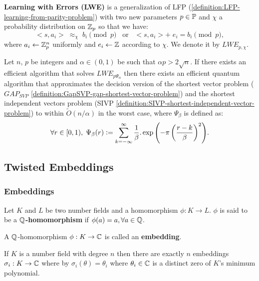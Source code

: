 \documentclass[a4paper,12pt]{article}
\begin{document}
\begin{definition}\label{definition:LWE-learning-with-errors-problem}
  \textbf{Learning with Errors (LWE)} is a generalization of LFP (\ref{definition:LFP-learning-from-parity-problem}) with two new parameters $p \in \P$ and $\chi$ a probability distribution on $\Z_p$ so that we have:
\[
  <s, a_i> \; \approx_\chi \; b_i \pmod p \;\;\; \text{or} \;\;\; <s, a_i> + \; e_i =  b_i \pmod p ,
    \]
     where $a_i \gets \Z^n_p$ uniformly and $e_i \gets \Z$ according to $\chi$. We denote
     it by $LWE_{p,\chi}$.

\end{definition}


\begin{theorem}
  Let $n$, $p$ be integers and $\alpha \in (0, 1)$ be such that $\alpha p > 2\sqrt{n}$. If
  there exists an efficient algorithm that solves $LWE_{p \Psi_\alpha}$ then there
  exists an efficient quantum algorithm that approximates the decision version
  of the shortest vector problem ($GAP_{SVP}$ \ref{definition:GapSVP-gap-shortest-vector-problem}) and the
  shortest independent vectors problem (SIVP \ref{definition:SIVP-shortest-independent-vector-problem}) to within
  $\tilde{O}(n/\alpha)$ in the worst case,  where $\Psi_\beta$ is defined as:
  $$
  \forall r \in [0,1), \; \Psi_\beta(r) \defsym \sum_{k=-\infty}^\infty{\frac{1}{\beta} . \exp{\left( -\pi \left( \frac{r-k}{\beta} \right)^2 \right)}}.
  $$
\end{theorem}
\subsection{Twisted Embeddings}
\label{sec:org803c9d7}
\subsubsection{Embeddings}
\label{sec:org280cbf1}

\begin{definition}
Let $K$ and $L$ be two number fields and a homomorphism $\phi: K \rightarrow L$. $\phi$ is said to be a \textbf{$\Q$-homomorphism} if $\phi(a) = a, \forall a \in \Q$.
\end{definition}

\begin{definition}
A $\Q$-homomorphism $\phi: K \rightarrow \C$ is called an \textbf{embedding}.
\end{definition}

\begin{theorem}
 If $K$ is a number field with degree $n$ then there are
exactly $n$ embeddings $\sigma_i : K \rightarrow \C$ where by $\sigma_i(\theta) =
\theta_i$ where $\theta_i \in \C$ is a distinct zero of $K$'s
minimum polynomial.
\end{theorem}
\end{document}
